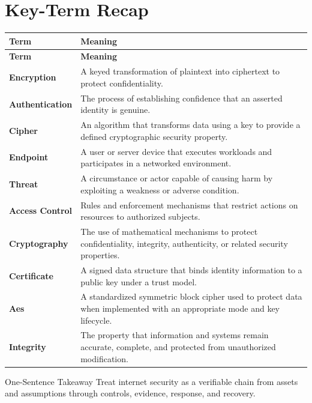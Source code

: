 \documentclass[11pt,letterpaper]{article}
\begin{document}
\section*{Key-Term Recap}
\begin{longtable}{>{\raggedright\arraybackslash}p{}>{\raggedright\arraybackslash}p{}}
\toprule\rowcolor{Navy}\color{white}\textbf{Term} & \color{white}\textbf{Meaning}\\\midrule
\endfirsthead
\toprule\rowcolor{Navy}\color{white}\textbf{Term} & \color{white}\textbf{Meaning}\\\midrule
\endhead
\textbf{Encryption} & A keyed transformation of plaintext into ciphertext to protect confidentiality. \\\midrule
\textbf{Authentication} & The process of establishing confidence that an asserted identity is genuine. \\\midrule
\textbf{Cipher} & An algorithm that transforms data using a key to provide a defined cryptographic security property. \\\midrule
\textbf{Endpoint} & A user or server device that executes workloads and participates in a networked environment. \\\midrule
\textbf{Threat} & A circumstance or actor capable of causing harm by exploiting a weakness or adverse condition. \\\midrule
\textbf{Access Control} & Rules and enforcement mechanisms that restrict actions on resources to authorized subjects. \\\midrule
\textbf{Cryptography} & The use of mathematical mechanisms to protect confidentiality, integrity, authenticity, or related security properties. \\\midrule
\textbf{Certificate} & A signed data structure that binds identity information to a public key under a trust model. \\\midrule
\textbf{Aes} & A standardized symmetric block cipher used to protect data when implemented with an appropriate mode and key lifecycle. \\\midrule
\textbf{Integrity} & The property that information and systems remain accurate, complete, and protected from unauthorized modification. \\\midrule
\bottomrule
\end{longtable}
\begin{CornellExamBox}{One-Sentence Takeaway}
Treat internet security as a verifiable chain from assets and assumptions through controls, evidence, response, and recovery.
\end{CornellExamBox}
\end{document}
